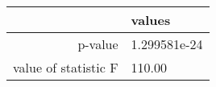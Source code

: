 \begin{tabular}{|r|l|}
  \hline
    & values \\
  \hline
  p-value & 1.299581e-24 \\
  \hline
  value of statistic F & 110.00 \\
  \hline
\end{tabular}
